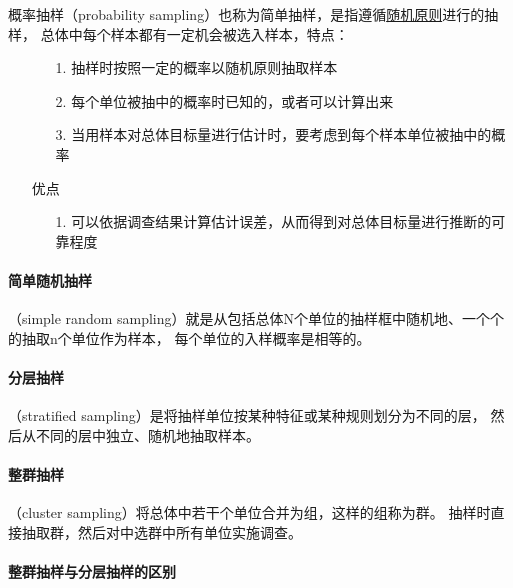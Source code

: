 \documentclass[UTF8,10pt]{book}
\begin{document}
    概率抽样（probability sampling）也称为简单抽样，是指遵循\underline{随机原则}进行的抽样，
    总体中每个样本都有一定机会被选入样本，特点：

	\begin{itemize}
		\item [] {
			\begin{enumerate}
				\item [1.] 抽样时按照一定的概率以随机原则抽取样本
				\item [2.] 每个单位被抽中的概率时已知的，或者可以计算出来
				\item [3.] 当用样本对总体目标量进行估计时，要考虑到每个样本单位被抽中的概率
			\end{enumerate}
		}
    \end{itemize}

	\begin{itemize}
		\item [优点] {
			\begin{enumerate}
				\item [1.] 可以依据调查结果计算估计误差，从而得到对总体目标量进行推断的可靠程度
			\end{enumerate}
		}
	\end{itemize}
    
    \paragraph{简单随机抽样}

    （simple random sampling）就是从包括总体N个单位的抽样框中随机地、一个个的抽取n个单位作为样本，
    每个单位的入样概率是相等的。

    \paragraph{分层抽样}

    （stratified sampling）是将抽样单位按某种特征或某种规则划分为不同的层，
    然后从不同的层中独立、随机地抽取样本。

    \paragraph{整群抽样}

    （cluster sampling）将总体中若干个单位合并为组，这样的组称为群。
    抽样时直接抽取群，然后对中选群中所有单位实施调查。
    
    \paragraph{整群抽样与分层抽样的区别}
    
\end{document}
